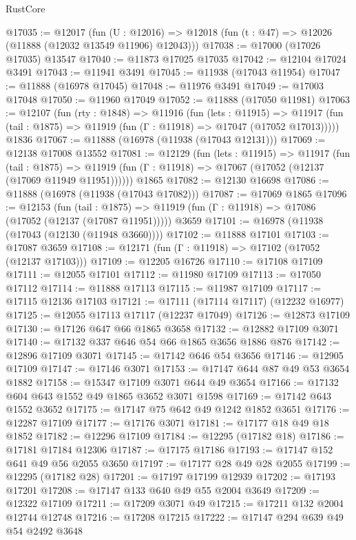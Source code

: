 \begin{lexlean}{RustCore}
\begin{coremodule}
@17035 := @12017
    (fun (U : @12016) => @12018 (fun (t : @47) => @12026 (@11888 (@12032 @13549 @11906) @12043)))
@17038 := @17000 (@17026 @17035) @13547
@17040 := @11873 @17025 @17035
@17042 := @12104 @17024 @3491
@17043 := @11941 @3491
@17045 := @11938 (@17043 @11954)
@17047 := @11888 (@16978 @17045)
@17048 := @11976 @3491
@17049 := @17003 @17048
@17050 := @11960 @17049
@17052 := @11888 (@17050 @11981)
@17063 := @12107
    (fun (rty : @1848) =>
    @11916
      (fun (lets : @11915) =>
      @11917 (fun (tail : @1875) => @11919 (fun (Γ : @11918) => @17047 (@17052 @17013)))))
    @1836
@17067 := @11888 (@16978 (@11938 (@17043 @12131)))
@17069 := @12138 @17008 @13552
@17081 := @12129
    (fun (lets : @11915) =>
    @11917
      (fun (tail : @1875) =>
      @11919 (fun (Γ : @11918) => @17067 (@17052 (@12137 (@17069 @11949 @11951))))))
    @1865
@17082 := @12130 @16698
@17086 := @11888 (@16978 (@11938 (@17043 @17082)))
@17087 := @17069 @1865
@17096 := @12153
    (fun (tail : @1875) => @11919 (fun (Γ : @11918) => @17086 (@17052 (@12137 (@17087 @11951)))))
    @3659
@17101 := @16978 (@11938 (@17043 (@12130 (@11948 @3660))))
@17102 := @11888 @17101
@17103 := @17087 @3659
@17108 := @12171 (fun (Γ : @11918) => @17102 (@17052 (@12137 @17103)))
@17109 := @12205 @16726
@17110 := @17108 @17109
@17111 := @12055 @17101
@17112 := @11980 @17109
@17113 := @17050 @17112
@17114 := @11888 @17113
@17115 := @11987 @17109
@17117 := @17115 @12136 @17103
@17121 := @17111 (@17114 @17117) (@12232 @16977)
@17125 := @12055 @17113 @17117 (@12237 @17049)
@17126 := @12873 @17109
@17130 := @17126 @647 @66 @1865 @3658
@17132 := @12882 @17109 @3071
@17140 := @17132 @337 @646 @54 @66 @1865 @3656 @1886 @876
@17142 := @12896 @17109 @3071
@17145 := @17142 @646 @54 @3656
@17146 := @12905 @17109
@17147 := @17146 @3071
@17153 := @17147 @644 @87 @49 @53 @3654 @1882
@17158 := @15347 @17109 @3071 @644 @49 @3654
@17166 := @17132 @604 @643 @1552 @49 @1865 @3652 @3071 @1598
@17169 := @17142 @643 @1552 @3652
@17175 := @17147 @75 @642 @49 @1242 @1852 @3651
@17176 := @12287 @17109
@17177 := @17176 @3071
@17181 := @17177 @18 @49 @18 @1852
@17182 := @12296 @17109
@17184 := @12295 (@17182 @18)
@17186 := @17181 @17184 @12306
@17187 := @17175 @17186
@17193 := @17147 @152 @641 @49 @56 @2055 @3650
@17197 := @17177 @28 @49 @28 @2055
@17199 := @12295 (@17182 @28)
@17201 := @17197 @17199 @12939
@17202 := @17193 @17201
@17208 := @17147 @133 @640 @49 @55 @2004 @3649
@17209 := @12322 @17109
@17211 := @17209 @3071 @49
@17215 := @17211 @132 @2004 @12744 @12748
@17216 := @17208 @17215
@17222 := @17147 @294 @639 @49 @54 @2492 @3648

\end{coremodule}
\end{lexlean}
